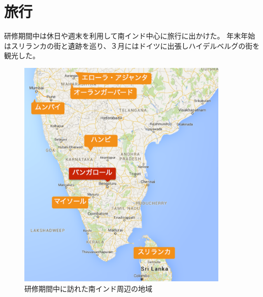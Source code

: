 \section{旅行}
研修期間中は休日や週末を利用して南インド中心に旅行に出かけた。
年末年始はスリランカの街と遺跡を巡り、３月にはドイツに出張しハイデルベルグの街を観光した。
\begin{figure}[ht]
  \centering
  \includegraphics[width=0.9\textwidth]{pic/india.eps}
  \caption{研修期間中に訪れた南インド周辺の地域}
\end{figure}
